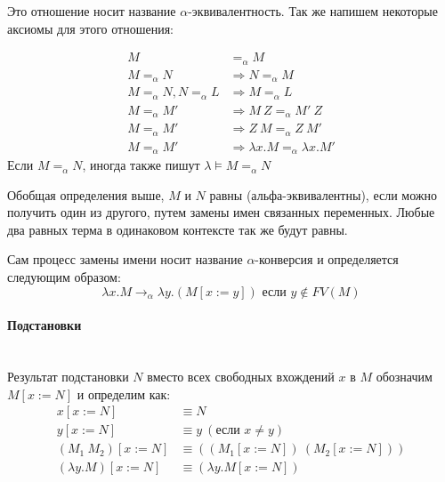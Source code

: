 \documentclass[lambda.tex]{subfiles}
\begin{document}
Это отношение носит название $\alpha$-эквивалентность. Так же напишем некоторые аксиомы для этого отношения:

\begin{align*}
M &=_\alpha M\\
M =_\alpha N &\Rightarrow N =_\alpha M\\
M =_\alpha N, N =_\alpha L &\Rightarrow M =_\alpha L\\
M =_\alpha M' &\Rightarrow M\ Z =_\alpha M'\ Z\\
M =_\alpha M' &\Rightarrow Z\ M =_\alpha Z\ M'\\
M =_\alpha M' &\Rightarrow \lambda x.M =_\alpha \lambda x.M'
\end{align*}
Если $M =_\alpha N$, иногда также пишут $\lambda\models M =_\alpha N$


Обобщая определения выше, $M$ и $N$ равны (альфа-эквивалентны), если можно получить один из другого, путем замены имен связанных переменных. Любые два равных терма в одинаковом контексте так же будут равны.

Сам процесс замены имени носит название $\alpha$-конверсия и определяется следующим образом:
\begin{equation*}
\lambda x.M \rightarrow_\alpha \lambda y.(M[x := y]) \text { если } y \not\in FV(M)\tag{$\alpha$}
\end{equation*}


\paragraph{Подстановки} %
\label{par:substitution}
~\\
Результат подстановки $N$ вместо всех свободных вхождений $x$ в $M$ обозначим $M[x := N]$ и определим как:
\begin{align*}
x[x := N] &\equiv N\\
y[x := N] &\equiv y\ (\text{если } x \neq y)\\
(M_1 \ M_2 )[x := N] &\equiv ((M_1 [x := N])\ (M_2 [x := N]))\\
(\lambda y.M)[x := N] &\equiv (\lambda y.M[x := N])
\end{align*}

\end{document}

